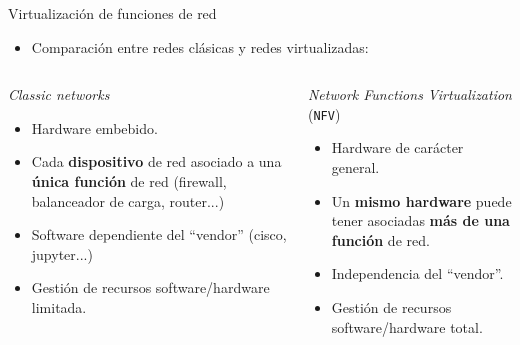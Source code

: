 \documentclass[aspectratio=169,xcolor=dvipsnames]{beamer}
\begin{document}
	\begin{frame}{Virtualización de funciones de red}
	    \begin{itemize}
	        \item Comparación entre redes clásicas y redes virtualizadas: 
	    \end{itemize}
	
	    \begin{columns}
	        \begin{column}{0.5\textwidth}
	        \begin{exampleblock}{\textit{Classic networks}}
	            \begin{itemize}
	                \item Hardware embebido.
	                \item Cada \textbf{dispositivo} de red asociado a una \textbf{única función} de red (firewall, balanceador de carga, router...)
	                \item Software dependiente del ``vendor'' (cisco, jupyter...)
	                \item Gestión de recursos software/hardware limitada.
	            \end{itemize}
	        \end{exampleblock}
	        \end{column}
	        
	        \begin{column}{0.5\textwidth}
	        \begin{exampleblock}{\textit{Network Functions Virtualization} (\texttt{NFV})}
	            \begin{itemize}
	                \item Hardware de carácter general.
	                \item Un \textbf{mismo hardware} puede tener asociadas \textbf{más de una función} de red.
	                \item Independencia del ``vendor''.
	                \item Gestión de recursos software/hardware total.
	            \end{itemize}
	        \end{exampleblock}
	        \end{column}
	    \end{columns}
	\end{frame}
	
\end{document}
